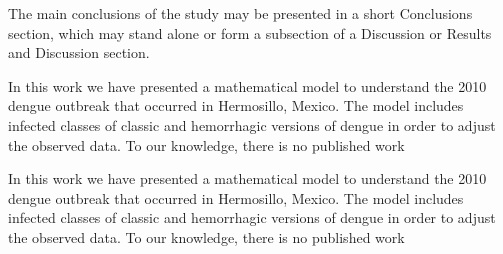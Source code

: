       The main conclusions of the study may be presented in a 
    short Conclusions section, which may stand alone or form 
    a subsection of a Discussion or Results and Discussion 
    section.
    
            In this work we have presented a mathematical model to
    understand the 2010  dengue outbreak that occurred in Hermosillo,
    Mexico. The model includes  infected classes of classic and
    hemorrhagic versions of dengue in order to  adjust the observed data.
    To our knowledge, there is no published work
        
        In this work we have presented a mathematical model to understand
    the 2010 dengue outbreak that occurred in Hermosillo, Mexico. The
    model includes infected classes of classic and hemorrhagic
    versions of dengue in order to adjust the observed data. To our
    knowledge, there is no published work